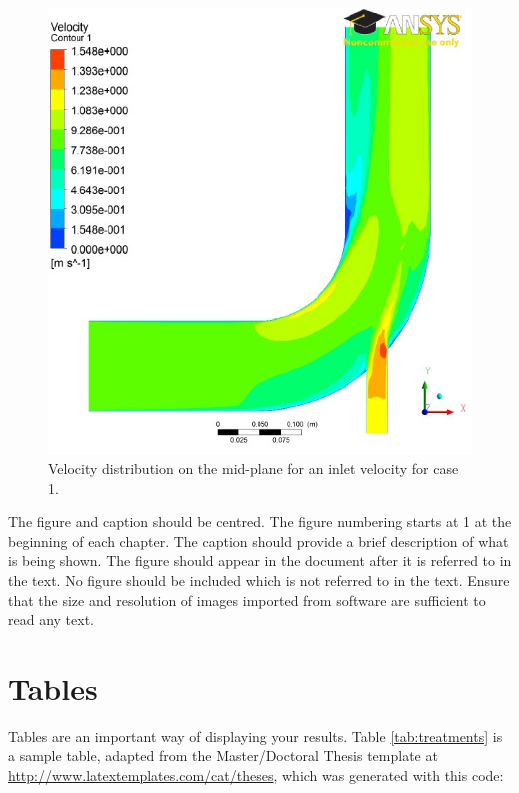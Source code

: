 \begin{figure}[h]
      \centering
      \includegraphics{background/5e1-1.pdf}
      \caption{Velocity distribution on the mid-plane for an inlet velocity for case 1.}
      \label{veldis}
\end{figure}

The figure and caption should be centred. The figure numbering starts at 1 at the beginning of each chapter. The caption should provide a brief description of what is being shown. The figure should appear in the document after it is referred to in the text. No figure should be included which is not referred to in the text. Ensure that the size and resolution of images imported from software are sufficient to read any text.

\section{Tables}
Tables are an important way of displaying your results. Table \ref{tab:treatments} is a sample table, adapted from the Master/Doctoral Thesis template at \url{http://www.latextemplates.com/cat/theses}, which was generated with this code:

